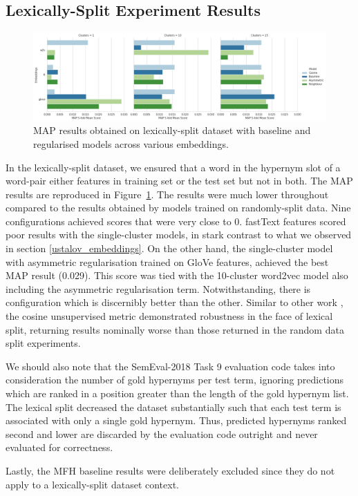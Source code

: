 \subsection{Lexically-Split Experiment Results}
\begin{figure}[ht!] 
  \centering
  \includegraphics[width=1.\linewidth]{images/MAP_lexical_split_results_models_baseline_embeddings.png}
  \caption{\ac{MAP} results obtained on lexically-split dataset with baseline and regularised models across various embeddings.}
  \label{fig:lexsplit_ustalov_map}
\end{figure}
In the lexically-split dataset, we ensured that a word in the hypernym slot of a word-pair either features in training set or the test set but not in both.  The \ac{MAP} results are reproduced in Figure~\ref{fig:lexsplit_ustalov_map}.  The results were much lower throughout compared to the results obtained by models trained on randomly-split data.  Nine configurations achieved scores that were very close to 0.  fastText features scored poor results with the single-cluster models, in stark contrast to what we observed in section \ref{ustalov_embeddings}.  On the other hand, the single-cluster model with asymmetric regularisation trained on GloVe features, achieved the best \ac{MAP} result (0.029).  This score was tied with the 10-cluster word2vec model also including the asymmetric regularisation term.  Notwithstanding, there is configuration which is discernibly better than the other.  Similar to other work \citep{shwartz2017siege}, the cosine unsupervised metric demonstrated robustness in the face of lexical split, returning results nominally worse than those returned in the random data split experiments.

We should also note that the SemEval-2018 Task 9 evaluation code takes into consideration the number of gold hypernyms per test term, ignoring predictions which are ranked in a position greater than the length of the gold hypernym list.  The lexical split decreased the dataset substantially such that each test term is associated with only a single gold hypernym.  Thus, predicted hypernyms ranked second and lower are discarded by the evaluation code outright and never evaluated for correctness.  

Lastly, the \ac{MFH} baseline results were deliberately excluded since they do not apply to a lexically-split dataset context.

